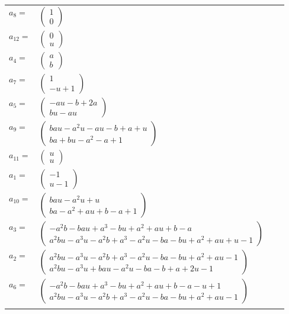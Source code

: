 \documentclass[1p]{elsarticle_modified}
\theoremstyle{definition}
\begin{document}
\begin{tabular}{m{7pt} m{180pt} m{7pt} m{180pt} }
\flushright $a_{8}=$&$\begin{pmatrix}1\\0\end{pmatrix}$ \\
\flushright $a_{12}=$&$\begin{pmatrix}0\\u\end{pmatrix}$ \\
\flushright $a_{4}=$&$\begin{pmatrix}a\\b\end{pmatrix}$ \\
\flushright $a_{7}=$&$\begin{pmatrix}1\\- u+1\end{pmatrix}$ \\
\flushright $a_{5}=$&$\begin{pmatrix}- a u- b+2 a\\b u- a u\end{pmatrix}$ \\
\flushright $a_{9}=$&$\begin{pmatrix}b a u- a^2 u- a u- b+a+u\\b a+b u- a^2- a+1\end{pmatrix}$ \\
\flushright $a_{11}=$&$\begin{pmatrix}u\\u\end{pmatrix}$ \\
\flushright $a_{1}=$&$\begin{pmatrix}-1\\u-1\end{pmatrix}$ \\
\flushright $a_{10}=$&$\begin{pmatrix}b a u- a^2 u+u\\b a- a^2+a u+b- a+1\end{pmatrix}$ \\
\flushright $a_{3}=$&$\begin{pmatrix}- a^2 b- b a u+a^3- b u+a^2+a u+b- a\\a^2 b u- a^3 u- a^2 b+a^3- a^2 u- b a- b u+a^2+a u+u-1\end{pmatrix}$ \\
\flushright $a_{2}=$&$\begin{pmatrix}a^2 b u- a^3 u- a^2 b+a^3- a^2 u- b a- b u+a^2+a u-1\\a^2 b u- a^3 u+b a u- a^2 u- b a- b+a+2 u-1\end{pmatrix}$ \\
\flushright $a_{6}=$&$\begin{pmatrix}- a^2 b- b a u+a^3- b u+a^2+a u+b- a- u+1\\a^2 b u- a^3 u- a^2 b+a^3- a^2 u- b a- b u+a^2+a u-1\end{pmatrix}$\\&\end{tabular}
\end{document}
